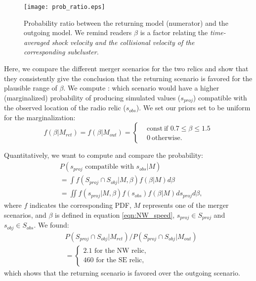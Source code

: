 \begin{figure}
	\texttt{[image: prob\_ratio.eps]}
	\caption{Probability ratio between the returning model (numerator) and
		the outgoing model. We remind readers $\beta$ is a factor
		relating the \it{time-averaged} shock velocity and the collisional
		velocity of the corresponding subcluster.  
	\label{fig:prob_ratio}}
\end{figure}

Here, we compare the different merger scenarios for the two relics and show that they consistently give the conclusion that the returning
scenario is favored for the plausible range of $\beta$. We compute :
which scenario would have a higher (marginalized) probability of producing simulated
values ($s_{proj}$) compatible with the observed location of the radio relic ($s_{obs}$). 
We set our priors set to be uniform for the marginalization: 
\begin{equation}
	f(\beta | M_{ret}) = f(\beta | M_{out}) =  
	\begin{cases}
		& \text{const}~\text{if } 0.7 \leq \beta \leq 1.5 \\
		& 0~\text{otherwise}.
	\end{cases}
\end{equation}

Quantitatively, we want to compute and compare the probability:  
\begin{align} 
	&P(s_{proj} \text{ compatible with }s_{obs} | M)  \label{eqn:prob}\\
	&=\int f(S_{proj} \cap S_{obj} | M, \beta) f(\beta | M) d\beta\\
	&=\iint  f(s_{proj}|M, \beta) f(s_{obs}) f(\beta | M) d s_{proj}
	d\beta, 
\end{align}
where $f$ indicates the corresponding PDF, $M$
represents one of the merger scenarios, and $\beta$ is defined in equation
\ref{eqn:NW_speed}, $s_{proj} \in S_{proj}$ and $s_{obj} \in S_{obs}$. 
We found: 
\begin{align}
	&P(S_{proj} \cap S_{obj} | M_{ret}) / P(S_{proj} \cap S_{obj} |
	M_{out})\\
	&=
 \begin{cases}
  2.1 \text{ for the NW relic},\\
  460 \text{ for the SE relic},
 \end{cases}
\end{align}
which shows that the returning scenario is favored over the outgoing
scenario. 

